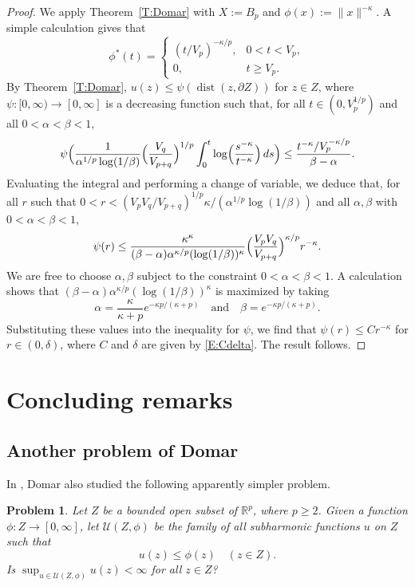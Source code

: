 \documentclass[11pt,reqno]{amsart}
\theoremstyle{plain}
\newtheorem{problem}[theorem]{Problem}
\theoremstyle{definition}
\theoremstyle{remark}
\newcommand{\cU}{\mathcal{U}}
\newcommand{\RR}{\mathbb{R}}
\DeclareMathOperator{\dist}{dist}
\begin{document}
\begin{proof}
We apply Theorem~\ref{T:Domar} with $X:=B_p$
and $\phi(x):=\|x\|^{-\kappa}$. A simple calculation
gives that 
\[
\phi^*(t)=
\begin{cases}
(t/V_p)^{-\kappa/p}, &0<t<V_p,\\
0, &t\ge V_p.
\end{cases}
\]
By Theorem~\ref{T:Domar},
$u(z)\le \psi(\dist(z,\partial Z))$ for $z\in Z$,
where $\psi:[0,\infty)\to[0,\infty]$ is a decreasing function
such that, for all $t\in(0,V_p^{1/p})$ and all $0<\alpha<\beta<1$,
\[
\psi\Bigl(\frac{1}{\alpha^{1/p}\log(1/\beta)}\Bigl(\frac{V_q}{V_{p+q}}\Bigr)^{1/p}
\int_0^t \log\Bigl(\frac{s^{-\kappa}}{t^{-\kappa}}\Bigr)\,ds\Bigr)
\le \frac{t^{-\kappa}/V_p^{-\kappa/p}}{\beta-\alpha}.
\]
Evaluating the integral and performing a change of variable, 
we deduce that,
for all $r$ such that $0<r<(V_pV_q/V_{p+q})^{1/p}\kappa/(\alpha^{1/p}\log(1/\beta))$ and all $\alpha,\beta$
with $0<\alpha<\beta<1$,
\[
\psi(r)\le \frac{\kappa^\kappa}{(\beta-\alpha)\alpha^{\kappa/p}(\log(1/\beta))^\kappa}\Bigl(\frac{V_pV_q}{V_{p+q}}\Bigr)^{\kappa/p}r^{-\kappa}.
\]
We are free to choose $\alpha,\beta$ subject to the constraint
$0<\alpha<\beta<1$. 
A calculation shows that $(\beta-\alpha)\alpha^{\kappa/p}(\log(1/\beta))^\kappa$
is maximized by taking
\[
\alpha=\frac{\kappa}{\kappa+p}e^{-\kappa p/(\kappa+p)}
\quad\text{and}\quad
\beta=e^{-\kappa p/(\kappa+p)}.
\]
Substituting these values into the inequality for $\psi$,
we find that $\psi(r)\le Cr^{-\kappa}$ for  
$r\in(0,\delta)$,
where $C$ and $\delta$ are given by \eqref{E:Cdelta}.
The result follows.
\end{proof}



\section{Concluding remarks}\label{S:conclusion}

\subsection{Another problem of Domar}

In \cite[\S2]{Do57}, Domar also studied the following apparently simpler
problem.

\begin{problem}\label{Pb:Domar2}
Let $Z$ be a bounded open
subset of $\RR^p$, 
where $p\ge2$.
Given a  function $\phi:Z\to[0,\infty]$, 
 let $\cU(Z,\phi)$ be the family
of all subharmonic functions $u$ on $Z$ such that
\[
u(z)\le \phi(z) \quad(z\in Z).
\]
Is $\sup_{u\in\cU(Z,\phi)}u(z)<\infty$ for all $z\in Z$?
\end{problem}
\end{document}
